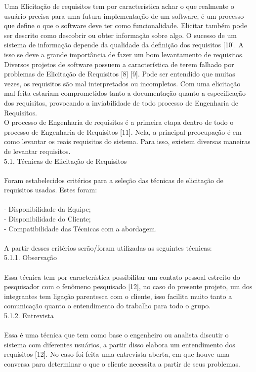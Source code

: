 {\tab Uma Elicitação de requisitos tem por característica achar o que realmente o usuário precisa para uma futura implementação de um software, é um processo que define o que o software deve ter como funcionalidade. Elicitar também pode ser descrito como descobrir ou obter informação sobre algo. O sucesso de um sistema de informação depende da qualidade da definição dos requisitos [10]. A isso se deve a grande importância de fazer um bom levantamento de requisitos.\\
\tab Diversos projetos de software possuem a característica de terem falhado por problemas de Elicitação de Requisitos [8] [9]. Pode ser entendido que muitas vezes, os requisitos são mal interpretados ou incompletos. Com uma elicitação mal feita estariam comprometidos tanto a documentação quanto a especificação dos requisitos, provocando a inviabilidade de todo processo de Engenharia de Requisitos.\\
\tab O processo de Engenharia de requisitos é a primeira etapa dentro de todo o processo de Engenharia de Requisitos [11]. Nela, a principal preocupação é em como levantar os reais requisitos do sistema. Para isso, existem diversas maneiras de levantar requisitos. \\

{\large{5.1. Técnicas de Elicitação de Requisitos}}\\ \\
\tab Foram estabelecidos critérios para a seleção das técnicas de elicitação de requisitos usadas. Estes foram:\\ \\
\tab - Disponibilidade da Equipe;\\
\tab - Disponibilidade do Cliente;\\
\tab - Compatibilidade das Técnicas com a abordagem.\\ \\
\tab A partir desses critérios serão/foram utilizadas as seguintes técnicas:\\

{\large{5.1.1. Observação}}\\ \\
\tab Essa técnica tem por característica possibilitar um contato pessoal estreito do pesquisador com o fenômeno pesquisado [12], no caso do presente projeto, um dos integrantes tem ligação parentesca com o cliente, isso facilita muito tanto a comunicação quanto o entendimento do trabalho para todo o grupo.\\

{\large{5.1.2. Entrevista}\\ \\
\tab Essa é uma técnica que tem como base o engenheiro ou analista discutir o sistema com diferentes usuários, a partir disso elabora um entendimento dos requisitos [12]. No caso foi feita uma entrevista aberta, em que houve uma conversa para determinar o que o cliente necessita a partir de seus problemas.\\

}}
